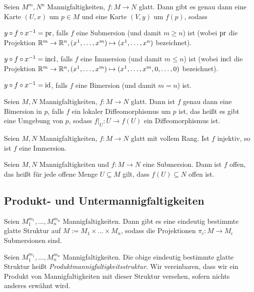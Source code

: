 \begin{korollar}[Normalformensatz]
  Seien $M^m,N^n$ Mannigfaltigkeiten, $f\colon M \to N$ glatt. Dann gibt
  es genau dann eine Karte $(U,x)$ um $p\in M$ und eine Karte $(V,y)$ um $f(p)$, sodass
  \begin{statements}
  \item $y\circ f\circ x^{-1} = \operatorname{pr}$, falls $f$ eine Submersion (und
    damit $m\geq n$) ist
    (wobei $\operatorname{pr}$ die Projektion $\mathbb{R}^m\to\mathbb{R}^n, (x^1,\dots,x^m) \mapsto
    (x^1,\dots,x^n)$ bezeichnet).
  \item $y\circ f\circ x^{-1} = \operatorname{incl}$, falls $f$ eine Immersion (und
    damit $m\leq n$) ist
    (wobei $\operatorname{incl}$ die Projektion $\mathbb{R}^m\to\mathbb{R}^n, (x^1,\dots,x^m) \mapsto
    (x^1,\dots,x^m,0,\dots,0)$ bezeichnet).
  \item $y\circ f\circ x^{-1} = \operatorname{id}$, falls $f$ eine Bimersion (und
    damit $m = n$) ist.
  \end{statements}
\end{korollar}

\begin{korollar}[Umkehrsatz]
  Seien $M,N$ Mannigfaltigkeiten, $f\colon M \to N$ glatt. Dann ist
  $f$ genau dann eine Bimersion in $p$, falls $f$ ein lokaler
  Diffeomorphismus um $p$ ist, das heißt es gibt eine Umgebung von
  $p$, sodass $f|_U\colon U \to f(U)$ ein Diffeomorphismus ist. 
\end{korollar}

\begin{proposition}
  Seien $M,N$ Mannigfaltigkeiten, $f\colon M \to N$ glatt mit vollem
  Rang. Ist $f$ injektiv, so ist $f$ eine Immersion.
\end{proposition}

\begin{proposition}
  Seien $M,N$ Mannigfaltigkeiten und $f\colon M \to N$ eine
  Submersion. Dann ist $f$ offen, das heißt für jede offene Menge
  $U\subseteq M$ gilt, dass $f(U) \subseteq N$ offen ist.
\end{proposition}

\subsection{Produkt- und Untermannigfaltigkeiten}
\label{sec:prumfk}

\begin{proposition}
  Seien $M_1^{m_1},\dots,M_n^{m_n}$ Mannigfaltigkeiten. Dann gibt es
  eine eindeutig bestimmte glatte Struktur auf $M :=
  M_1\times\dots\times M_n$, sodass die Projektionen $\pi_i \colon M
  \to M_i$ Submersionen sind.
\end{proposition}

\begin{definition}
  Seien $M_1^{m_1},\dots,M_n^{m_n}$ Mannigfaltigkeiten. Die obige
  eindeutig bestimmte glatte  Struktur heißt
  \emph{Produktmannigfaltigkeitsstruktur}. Wir vereinbaren, dass wir
  ein Produkt von Mannigfaltigkeiten mit dieser Struktur versehen,
  sofern nichts anderes erwähnt wird.
\end{definition}



